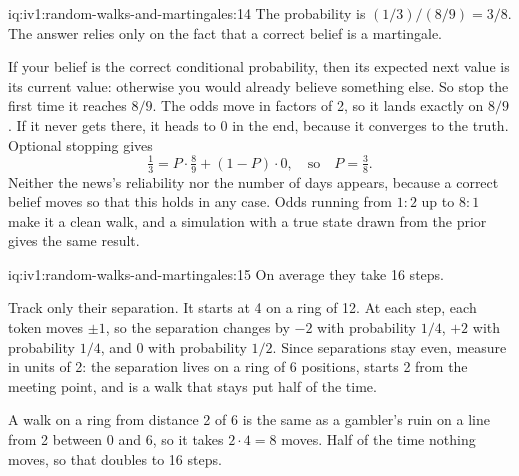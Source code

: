 \begin{solution}{iq:iv1:random-walks-and-martingales:14}
The probability is $(1/3)/(8/9) = 3/8$. The answer relies only on the fact that a correct belief is a martingale.

If your belief is the correct conditional probability, then its expected next value is its current value: otherwise you would already believe something else. So stop the first time it reaches $8/9$. The odds move in factors of 2, so it lands exactly on $8/9$. If it never gets there, it heads to 0 in the end, because it converges to the truth. Optional stopping gives
\[
\tfrac13 = P \cdot \tfrac89 + (1 - P) \cdot 0, \quad\text{so}\quad P = \tfrac38.
\]
Neither the news's reliability nor the number of days appears, because a correct belief moves so that this holds in any case. Odds running from $1 : 2$ up to $8 : 1$ make it a clean walk, and a simulation with a true state drawn from the prior gives the same result.

\end{solution}

\begin{solution}{iq:iv1:random-walks-and-martingales:15}
On average they take 16 steps.

Track only their separation. It starts at 4 on a ring of 12. At each step, each token moves $\pm 1$, so the separation changes by $-2$ with probability $1/4$, $+2$ with probability $1/4$, and 0 with probability $1/2$. Since separations stay even, measure in units of 2: the separation lives on a ring of 6 positions, starts 2 from the meeting point, and is a walk that stays put half of the time.

A walk on a ring from distance 2 of 6 is the same as a gambler's ruin on a line from 2 between 0 and 6, so it takes $2 \cdot 4 = 8$ moves. Half of the time nothing moves, so that doubles to 16 steps.

\end{solution}

